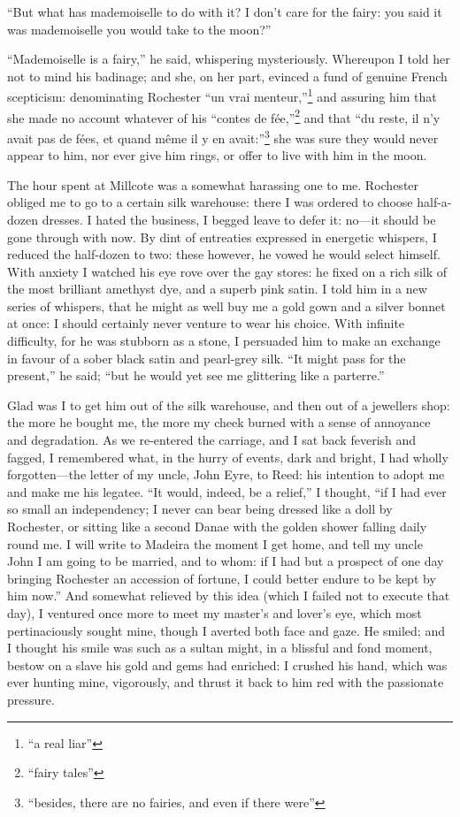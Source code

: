 \enquote{But what has mademoiselle to do with it?  I don't care for the
	fairy: you said it was mademoiselle you would take to the moon?}

\enquote{Mademoiselle is a fairy,} he said, whispering mysteriously.
Whereupon I told her not to mind his badinage; and she, on her part,
evinced a fund of genuine French scepticism: denominating \Mr{} Rochester
\foreignquote{french}{un vrai menteur,}\footnote{\enquote{a real liar}} and assuring him that she made no account
whatever of his \foreignquote{french}{contes de fée,}\footnote{\enquote{fairy tales}} and that \foreignquote{french}{du reste, il
	n'y avait pas de fées, et quand même il y en avait:}\footnote{
	\enquote{besides, there are no fairies, and even if there were}} she was sure they
would never appear to him, nor ever give him rings, or offer to live
with him in the moon.

The hour spent at Millcote was a somewhat harassing one to me.  \Mr{}
Rochester obliged me to go to a certain silk warehouse: there I was
ordered to choose half-a-dozen dresses.  I hated the business, I begged
leave to defer it: no---it should be gone through with now.  By dint of
entreaties expressed in energetic whispers, I reduced the half-dozen to
two: these however, he vowed he would select himself.  With anxiety I
watched his eye rove over the gay stores: he fixed on a rich silk of the
most brilliant amethyst dye, and a superb pink satin.  I told him in a
new series of whispers, that he might as well buy me a gold gown and a
silver bonnet at once: I should certainly never venture to wear his
choice.  With infinite difficulty, for he was stubborn as a stone, I
persuaded him to make an exchange in favour of a sober black satin and
pearl-grey silk.  \enquote{It might pass for the present,} he said;
\enquote{but he would yet see me glittering like a parterre.}

Glad was I to get him out of the silk warehouse, and then out of a
jewellers shop: the more he bought me, the more my cheek burned with a
sense of annoyance and degradation.  As we re-entered the carriage, and
I sat back feverish and fagged, I remembered what, in the hurry of
events, dark and bright, I had wholly forgotten---the letter of my
uncle, John Eyre, to \Mrs{} Reed: his intention to adopt me and make me
his legatee.  \enquote{It would, indeed, be a relief,} I thought,
\enquote{if I had ever so small an independency; I never can bear being
	dressed like a doll by \Mr{} Rochester, or sitting like a second Danae
	with the golden shower falling daily round me.  I will write to Madeira
	the moment I get home, and tell my uncle John I am going to be married,
	and to whom: if I had but a prospect of one day bringing \Mr{} Rochester
	an accession of fortune, I could better endure to be kept by him now.}
And somewhat relieved by this idea (which I failed not to execute that
day), I ventured once more to meet my master's and lover's eye, which
most pertinaciously sought mine, though I averted both face and gaze.
He smiled; and I thought his smile was such as a sultan might, in a
blissful and fond moment, bestow on a slave his gold and gems had
enriched: I crushed his hand, which was ever hunting mine, vigorously,
and thrust it back to him red with the passionate pressure.

